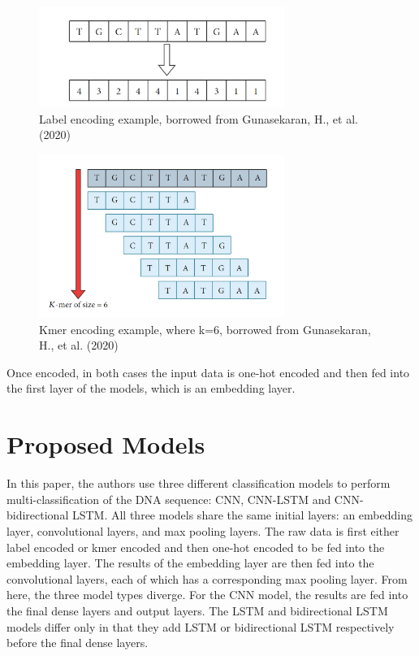 \documentclass[journal]{IEEEtran}
\begin{document}
  \begin{figure}
    \centering
    \includegraphics[width=8cm]{figures/label_encoding.png}
    \caption{Label encoding example, borrowed from Gunasekaran, H., et al. (2020)}
  \end{figure}

  \begin{figure}
    \centering
    \includegraphics[width=8cm]{figures/kmer_encoding.png}
    \caption{Kmer encoding example, where k=6, borrowed from Gunasekaran, H., et al. (2020)}
  \end{figure}

  Once encoded, in both cases the input data is one-hot encoded and then fed into
  the first layer of the models, which is an embedding layer.

\section{Proposed Models}
  In this paper, the authors use three different classification models to perform multi-classification 
  of the DNA sequence: CNN, CNN-LSTM and CNN-bidirectional LSTM.
  All three models share the same initial layers: an embedding layer, convolutional layers, and
  max pooling layers. The raw data is first either label encoded or kmer encoded and then 
  one-hot encoded to be fed into the embedding layer. The results of the embedding layer
  are then fed into the convolutional layers, each of which has a corresponding max pooling layer.
  From here, the three model types diverge. For the CNN model, the results are fed into
  the final dense layers and output layers. The LSTM and bidirectional LSTM models differ only
  in that they add LSTM or bidirectional LSTM respectively before the final dense layers. 
\end{document}
